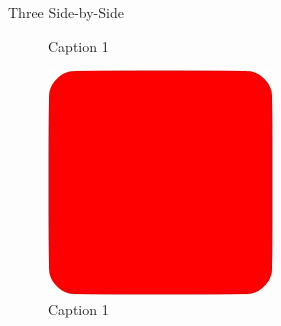 \begin{frame}{Three Side-by-Side}
\begin{figure}
\begin{minipage}{0.32\textwidth}
        \caption{Caption 1}
    \end{minipage}\hfill
    \begin{minipage}{0.32\textwidth}
        \centering
        \includegraphics[width=\linewidth]{assets/placeholder.png} %
        \caption{Caption 1}
    \end{minipage}
\end{figure}
\end{frame}
